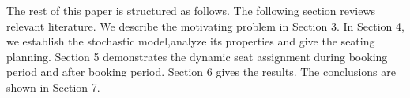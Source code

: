 

The rest of this paper is structured as follows. The following section reviews relevant literature. We describe the motivating problem in Section 3. In Section 4, we establish the stochastic model,analyze its properties and give the seating planning. Section 5 demonstrates the dynamic seat assignment during booking period and after booking period. Section 6 gives the results. The conclusions are shown in Section 7.

\newpage

